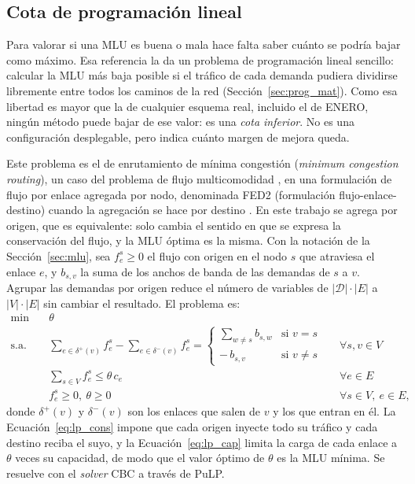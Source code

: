 \subsection{Cota de programación lineal}\label{sec:lp}

Para valorar si una MLU es buena o mala hace falta saber cuánto se podría bajar como máximo. Esa referencia la da un problema de programación lineal sencillo: calcular la MLU más baja posible si el tráfico de cada demanda pudiera dividirse libremente entre todos los caminos de la red (Sección~\ref{sec:prog_mat}). Como esa libertad es mayor que la de cualquier esquema real, incluido el de ENERO, ningún método puede bajar de ese valor: es una \emph{cota inferior}. No es una configuración desplegable, pero indica cuánto margen de mejora queda.

Este problema es el de enrutamiento de mínima congestión (\textit{minimum congestion routing}), un caso del problema de flujo multicomodidad \cite{ahuja1993network}, en una formulación de flujo por enlace agregada por nodo, denominada FED2 (formulación flujo-enlace-destino) cuando la agregación se hace por destino \cite{DDR}. En este trabajo se agrega por origen, que es equivalente: solo cambia el sentido en que se expresa la conservación del flujo, y la MLU óptima es la misma. Con la notación de la Sección~\ref{sec:mlu}, sea $f^{s}_{e} \geq 0$ el flujo con origen en el nodo $s$ que atraviesa el enlace $e$, y $b_{s,v}$ la suma de los anchos de banda de las demandas de $s$ a $v$. Agrupar las demandas por origen reduce el número de variables de $|\mathcal{D}|\cdot|E|$ a $|V|\cdot|E|$ sin cambiar el resultado. El problema es:
\begin{align}
	\min \quad & \theta \label{eq:lp_obj}\\
	\text{s.a.} \quad & \sum_{e \in \delta^{+}(v)} f^{s}_{e} - \sum_{e \in \delta^{-}(v)} f^{s}_{e} =
	\begin{cases}
		\sum_{w \neq s} b_{s,w} & \text{si } v = s \\
		-\, b_{s,v} & \text{si } v \neq s
	\end{cases}
	&& \forall s, v \in V \label{eq:lp_cons}\\
	& \sum_{s \in V} f^{s}_{e} \leq \theta\, c_e && \forall e \in E \label{eq:lp_cap}\\
	& f^{s}_{e} \geq 0,\ \theta \geq 0 && \forall s \in V,\ e \in E,
\end{align}
donde $\delta^{+}(v)$ y $\delta^{-}(v)$ son los enlaces que salen de $v$ y los que entran en él. La Ecuación~\eqref{eq:lp_cons} impone que cada origen inyecte todo su tráfico y cada destino reciba el suyo, y la Ecuación~\eqref{eq:lp_cap} limita la carga de cada enlace a $\theta$ veces su capacidad, de modo que el valor óptimo de $\theta$ es la MLU mínima. Se resuelve con el \textit{solver} CBC a través de PuLP.


